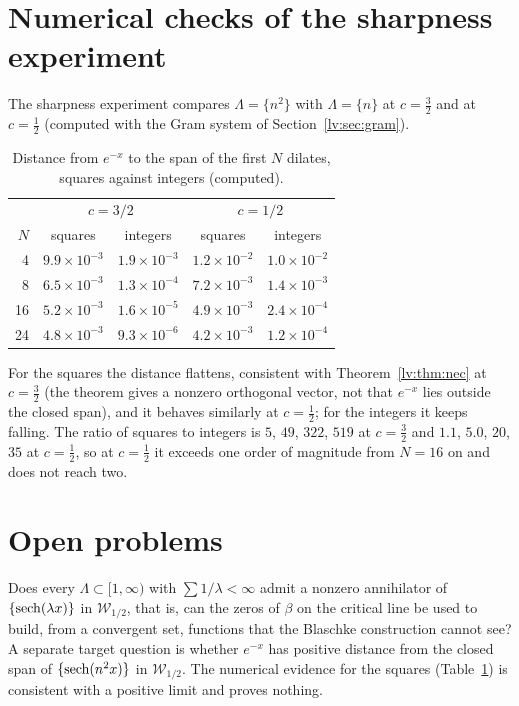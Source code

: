 \section{Numerical checks of the sharpness experiment}\label{lv:sec:numerics}

The sharpness experiment compares $\Lambda=\{n^2\}$ with $\Lambda=\{n\}$ at $c=\frac32$ and at $c=\frac12$ (computed with the Gram system of Section~\ref{lv:sec:gram}).

\begin{table}[h]\centering\footnotesize
\begin{tabular}{rcccc}
\toprule
& \multicolumn{2}{c}{$c=3/2$} & \multicolumn{2}{c}{$c=1/2$}\\
$N$ & squares & integers & squares & integers\\
\midrule
4 & $9.9\times10^{-3}$ & $1.9\times10^{-3}$ & $1.2\times10^{-2}$ & $1.0\times10^{-2}$\\
8 & $6.5\times10^{-3}$ & $1.3\times10^{-4}$ & $7.2\times10^{-3}$ & $1.4\times10^{-3}$\\
16 & $5.2\times10^{-3}$ & $1.6\times10^{-5}$ & $4.9\times10^{-3}$ & $2.4\times10^{-4}$\\
24 & $4.8\times10^{-3}$ & $9.3\times10^{-6}$ & $4.2\times10^{-3}$ & $1.2\times10^{-4}$\\
\bottomrule
\end{tabular}
\caption{Distance from $e^{-x}$ to the span of the first $N$ dilates, squares against integers (computed).}\label{lv:tab:squares}
\end{table}

For the squares the distance flattens, consistent with Theorem~\ref{lv:thm:nec} at $c=\frac32$ (the theorem gives a nonzero orthogonal vector, not that $e^{-x}$ lies outside the closed span), and it behaves similarly at $c=\frac12$; for the integers it keeps falling. The ratio of squares to integers is $5$, $49$, $322$, $519$ at $c=\frac32$ and $1.1$, $5.0$, $20$, $35$ at $c=\frac12$, so at $c=\frac12$ it exceeds one order of magnitude from $N=16$ on and does not reach two.

\section{Open problems}\label{lv:sec:open}

\begin{problem}[sharpness at $c=\frac12$]\label{lv:prob:sharp}
Does every $\Lambda\subset[1,\infty)$ with $\sum1/\lambda<\infty$ admit a nonzero annihilator of $\{\operatorname{sech}(\lambda x)\}$ in $\mathcal W_{1/2}$, that is, can the zeros of $\beta$ on the critical line be used to build, from a convergent set, functions that the Blaschke construction cannot see? A separate target question is whether $e^{-x}$ has positive distance from the closed span of $\{\operatorname{sech}(n^2x)\}$ in $\mathcal W_{1/2}$. The numerical evidence for the squares (Table~\ref{lv:tab:squares}) is consistent with a positive limit and proves nothing.
\end{problem}

